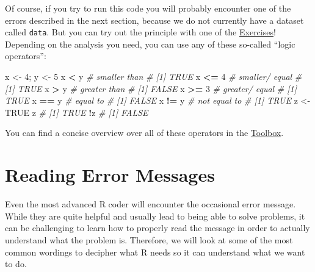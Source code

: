 \documentclass[
]{book}
\newenvironment{Shaded}{\begin{snugshade}}{\end{snugshade}}
\newcommand{\CommentTok}[1]{\textcolor[rgb]{0.56,0.35,0.01}{\textit{#1}}}
\newcommand{\ConstantTok}[1]{\textcolor[rgb]{0.56,0.35,0.01}{#1}}
\newcommand{\DecValTok}[1]{\textcolor[rgb]{0.00,0.00,0.81}{#1}}
\newcommand{\FunctionTok}[1]{\textcolor[rgb]{0.13,0.29,0.53}{\textbf{#1}}}
\newcommand{\NormalTok}[1]{#1}
\newcommand{\OtherTok}[1]{\textcolor[rgb]{0.56,0.35,0.01}{#1}}
\newcommand{\SpecialCharTok}[1]{\textcolor[rgb]{0.81,0.36,0.00}{\textbf{#1}}}
\newcommand{\StringTok}[1]{\textcolor[rgb]{0.31,0.60,0.02}{#1}}
\begin{document}
\begin{Shaded}
\end{Shaded}

Of course, if you try to run this code you will probably encounter one of the errors described in the next section, because we do not currently have a dataset called \texttt{data}.
But you can try out the principle with one of the \hyperref[exercises]{Exercises}!
Depending on the analysis you need, you can use any of these so-called ``logic operators'':

\begin{Shaded}
\begin{Highlighting}[]
\NormalTok{x }\OtherTok{\textless{}{-}} \DecValTok{4}\NormalTok{; y }\OtherTok{\textless{}{-}} \DecValTok{5}
\NormalTok{x }\SpecialCharTok{\textless{}}\NormalTok{ y }\CommentTok{\# smaller than}
\CommentTok{\# [1] TRUE}
\NormalTok{x }\SpecialCharTok{\textless{}=} \DecValTok{4} \CommentTok{\# smaller/ equal}
\CommentTok{\# [1] TRUE}
\NormalTok{x }\SpecialCharTok{\textgreater{}}\NormalTok{ y }\CommentTok{\# greater than}
\CommentTok{\# [1] FALSE}
\NormalTok{x }\SpecialCharTok{\textgreater{}=} \DecValTok{3} \CommentTok{\# greater/ equal}
\CommentTok{\# [1] TRUE}
\NormalTok{x }\SpecialCharTok{==}\NormalTok{ y }\CommentTok{\# equal to}
\CommentTok{\# [1] FALSE}
\NormalTok{x }\SpecialCharTok{!=}\NormalTok{ y }\CommentTok{\# not equal to}
\CommentTok{\# [1] TRUE}
\NormalTok{z }\OtherTok{\textless{}{-}} \ConstantTok{TRUE}
\NormalTok{z}
\CommentTok{\# [1] TRUE}
\SpecialCharTok{!}\NormalTok{z}
\CommentTok{\# [1] FALSE}
\end{Highlighting}
\end{Shaded}

You can find a concise overview over all of these operators in the \hyperref[toolbox]{Toolbox}.

\section{Reading Error Messages}\label{reading-error-messages}

Even the most advanced R coder will encounter the occasional error message.
While they are quite helpful and usually lead to being able to solve problems, it can be challenging to learn how to properly read the message in order to actually understand what the problem is.
Therefore, we will look at some of the most common wordings to decipher what R needs so it can understand what we want to do.
\end{document}
